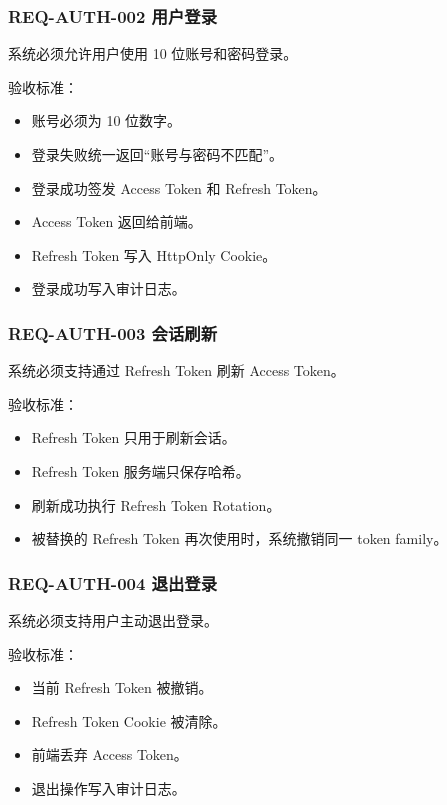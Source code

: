 \documentclass[
  a4paper,
  UTF8]{ctexart}
\providecommand{\tightlist}{%
  \setlength{\itemsep}{0pt}\setlength{\parskip}{0pt}}
\begin{document}
\hypertarget{req-auth-002-ux7528ux6237ux767bux5f55}{%
\subsubsection{REQ-AUTH-002
用户登录}\label{req-auth-002-ux7528ux6237ux767bux5f55}}

系统必须允许用户使用 10 位账号和密码登录。

验收标准：

\begin{itemize}
\tightlist
\item
  账号必须为 10 位数字。
\item
  登录失败统一返回``账号与密码不匹配''。
\item
  登录成功签发 Access Token 和 Refresh Token。
\item
  Access Token 返回给前端。
\item
  Refresh Token 写入 HttpOnly Cookie。
\item
  登录成功写入审计日志。
\end{itemize}

\hypertarget{req-auth-003-ux4f1aux8bddux5237ux65b0}{%
\subsubsection{REQ-AUTH-003
会话刷新}\label{req-auth-003-ux4f1aux8bddux5237ux65b0}}

系统必须支持通过 Refresh Token 刷新 Access Token。

验收标准：

\begin{itemize}
\tightlist
\item
  Refresh Token 只用于刷新会话。
\item
  Refresh Token 服务端只保存哈希。
\item
  刷新成功执行 Refresh Token Rotation。
\item
  被替换的 Refresh Token 再次使用时，系统撤销同一 token family。
\end{itemize}

\hypertarget{req-auth-004-ux9000ux51faux767bux5f55}{%
\subsubsection{REQ-AUTH-004
退出登录}\label{req-auth-004-ux9000ux51faux767bux5f55}}

系统必须支持用户主动退出登录。

验收标准：

\begin{itemize}
\tightlist
\item
  当前 Refresh Token 被撤销。
\item
  Refresh Token Cookie 被清除。
\item
  前端丢弃 Access Token。
\item
  退出操作写入审计日志。
\end{itemize}
\end{document}
